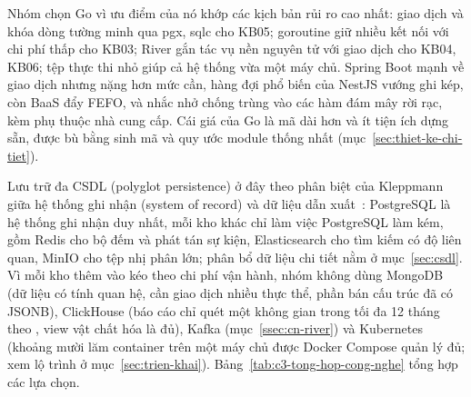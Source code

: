 Nhóm chọn Go vì ưu điểm của nó khớp các kịch bản rủi ro cao nhất: giao dịch và khóa dòng tường minh qua pgx, sqlc cho KB05; goroutine giữ nhiều kết nối với chi phí thấp cho KB03; River gắn tác vụ nền nguyên tử với giao dịch cho KB04, KB06; tệp thực thi nhỏ giúp cả hệ thống vừa một máy chủ. Spring Boot mạnh về giao dịch nhưng nặng hơn mức cần, hàng đợi phổ biến của NestJS vướng ghi kép, còn BaaS đẩy FEFO,  và nhắc nhở chống trùng vào các hàm đám mây rời rạc, kèm phụ thuộc nhà cung cấp. Cái giá của Go là mã dài hơn và ít tiện ích dựng sẵn, được bù bằng sinh mã và quy ước module thống nhất (mục~\ref{sec:thiet-ke-chi-tiet}).

Lưu trữ đa CSDL (polyglot persistence) ở đây theo phân biệt của Kleppmann giữa hệ thống ghi nhận (system of record) và dữ liệu dẫn xuất~\cite{kleppmann}: PostgreSQL là hệ thống ghi nhận duy nhất, mỗi kho khác chỉ làm việc PostgreSQL làm kém, gồm Redis cho bộ đếm và phát tán sự kiện, Elasticsearch cho tìm kiếm có độ liên quan, MinIO cho tệp nhị phân lớn; phân bổ dữ liệu chi tiết nằm ở mục~\ref{sec:csdl}. Vì mỗi kho thêm vào kéo theo chi phí vận hành, nhóm không dùng MongoDB (dữ liệu có tính quan hệ, cần giao dịch nhiều thực thể, phần bán cấu trúc đã có JSONB), ClickHouse (báo cáo chỉ quét một không gian trong tối đa 12 tháng theo , view vật chất hóa là đủ), Kafka (mục~\ref{ssec:cn-river}) và Kubernetes (khoảng mười lăm container trên một máy chủ được Docker Compose quản lý đủ; xem lộ trình ở mục~\ref{sec:trien-khai}). Bảng~\ref{tab:c3-tong-hop-cong-nghe} tổng hợp các lựa chọn.

